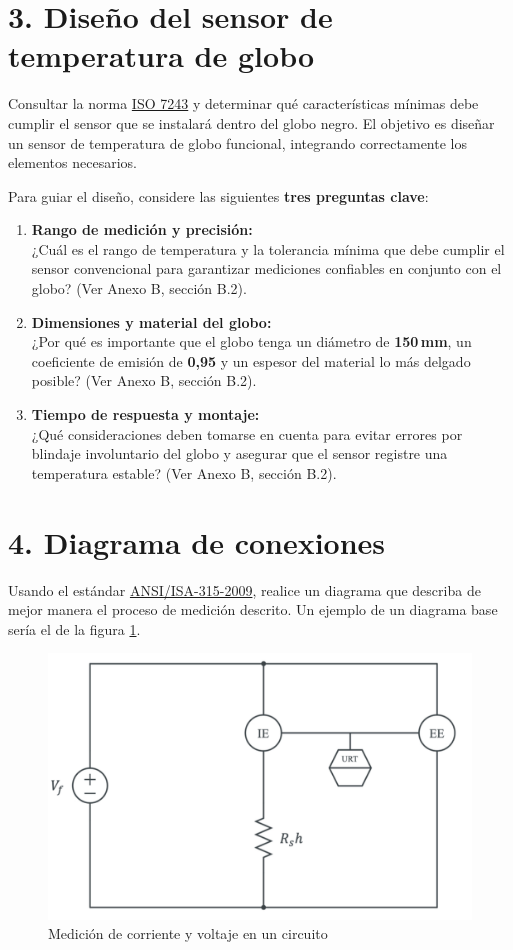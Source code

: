 \documentclass[11pt]{article}
\begin{document}
\section*{3. Diseño del sensor de temperatura de globo}
Consultar la norma \href{https://es.slideshare.net/slideshow/international-standard-iso-7243/251054896}{ISO 7243} y determinar qué características mínimas debe cumplir el sensor que se instalará dentro del globo negro.  
El objetivo es diseñar un sensor de temperatura de globo funcional, integrando correctamente los elementos necesarios.

Para guiar el diseño, considere las siguientes \textbf{tres preguntas clave}:

\begin{enumerate}
    \item \textbf{Rango de medición y precisión:} \\
    ¿Cuál es el rango de temperatura y la tolerancia mínima que debe cumplir el sensor convencional para garantizar mediciones confiables en conjunto con el globo? (Ver Anexo B, sección B.2).
    \item \textbf{Dimensiones y material del globo:} \\
    ¿Por qué es importante que el globo tenga un diámetro de \textbf{150\,mm}, un coeficiente de emisión de \textbf{0,95} y un espesor del material lo más delgado posible? (Ver Anexo B, sección B.2).
    \item \textbf{Tiempo de respuesta y montaje:} \\
    ¿Qué consideraciones deben tomarse en cuenta para evitar errores por blindaje involuntario del globo y asegurar que el sensor registre una temperatura estable? (Ver Anexo B, sección B.2).
\end{enumerate}

\section*{4. Diagrama de conexiones}
Usando el estándar \href{https://www.scribd.com/document/621156343/ANSI-ISA-5-1-2009-Traducido}{ANSI/ISA-315-2009}, realice un diagrama que describa de mejor manera el proceso de medición descrito. Un ejemplo de un diagrama base sería el de la figura \ref{ejemplo 2}.
\begin{figure}[h]
    \centering
    \includegraphics[width=0.4\linewidth]{fig/diagrama2.jpg}
    \caption{Medición de corriente y voltaje en un circuito}
    \label{ejemplo 2}
\end{figure}
\end{document}
